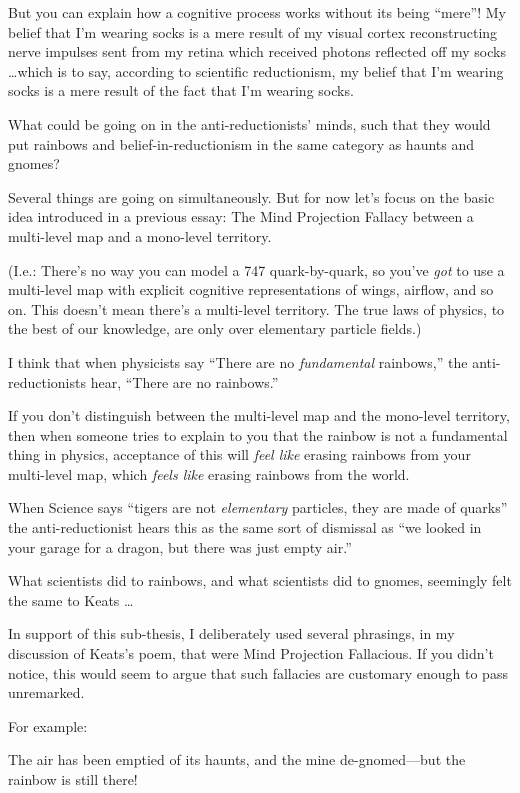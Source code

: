 {
 But you can explain how a cognitive process works without its
being ``mere''! My belief that
I'm wearing socks is a mere result of my visual cortex
reconstructing nerve impulses sent from my retina which received
photons reflected off my socks \ldots which is to say, according to
scientific reductionism, my belief that I'm wearing
socks is a mere result of the fact that I'm wearing
socks.}

{
 What could be going on in the anti-reductionists'
minds, such that they would put rainbows and belief-in-reductionism in
the same category as haunts and gnomes?}

{
 Several things are going on simultaneously. But for now
let's focus on the basic idea introduced in a previous
essay: The Mind Projection Fallacy between a multi-level map and a
mono-level territory.}

{
 (I.e.: There's no way you can model a 747
quark-by-quark, so you've \textit{got} to use a
multi-level map with explicit cognitive representations of wings,
airflow, and so on. This doesn't mean
there's a multi-level territory. The true laws of
physics, to the best of our knowledge, are only over elementary
particle fields.)}

{
 I think that when physicists say ``There are no
\textit{fundamental} rainbows,'' the
anti-reductionists hear, ``There are no
rainbows.''}

{
 If you don't distinguish between the multi-level
map and the mono-level territory, then when someone tries to explain to
you that the rainbow is not a fundamental thing in physics, acceptance
of this will \textit{feel like} erasing rainbows from your multi-level
map, which \textit{feels like} erasing rainbows from the world.}

{
 When Science says ``tigers are not
\textit{elementary} particles, they are made of
quarks'' the anti-reductionist hears this as the same
sort of dismissal as ``we looked in your garage for a
dragon, but there was just empty air.''}

{
 What scientists did to rainbows, and what scientists did to
gnomes, seemingly felt the same to Keats \ldots}

{
 In support of this sub-thesis, I deliberately used several
phrasings, in my discussion of Keats's poem, that were
Mind Projection Fallacious. If you didn't notice, this
would seem to argue that such fallacies are customary enough to pass
unremarked.}

{
 For example:}

{
 The air has been emptied of its haunts, and the mine
de-gnomed---but the rainbow is still there!}

